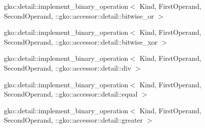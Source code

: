 \begin{DoxyCompactList}
\item gko\+:\+:detail\+:\+:implement\+\_\+binary\+\_\+operation$<$ Kind, First\+Operand, Second\+Operand, \+:\+:gko\+:\+:accessor\+:\+:detail\+:\+:bitwise\+\_\+or $>$\begin{DoxyCompactList}
\item {}
\end{DoxyCompactList}
\item gko\+:\+:detail\+:\+:implement\+\_\+binary\+\_\+operation$<$ Kind, First\+Operand, Second\+Operand, \+:\+:gko\+:\+:accessor\+:\+:detail\+:\+:bitwise\+\_\+xor $>$\begin{DoxyCompactList}
\item {}
\end{DoxyCompactList}
\item gko\+:\+:detail\+:\+:implement\+\_\+binary\+\_\+operation$<$ Kind, First\+Operand, Second\+Operand, \+:\+:gko\+:\+:accessor\+:\+:detail\+:\+:div $>$\begin{DoxyCompactList}
\item {}
\end{DoxyCompactList}
\item gko\+:\+:detail\+:\+:implement\+\_\+binary\+\_\+operation$<$ Kind, First\+Operand, Second\+Operand, \+:\+:gko\+:\+:accessor\+:\+:detail\+:\+:equal $>$\begin{DoxyCompactList}
\item {}
\end{DoxyCompactList}
\item gko\+:\+:detail\+:\+:implement\+\_\+binary\+\_\+operation$<$ Kind, First\+Operand, Second\+Operand, \+:\+:gko\+:\+:accessor\+:\+:detail\+:\+:greater $>$\begin{DoxyCompactList}
\item {}
\end{DoxyCompactList}

\end{DoxyCompactList}
